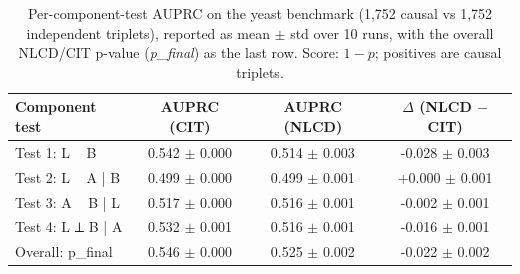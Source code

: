 \begin{table}
\centering
\caption{Per-component-test AUPRC on the yeast benchmark (1{,}752 causal vs 1{,}752 independent triplets), reported as mean $\pm$ std over 10 runs, with the overall NLCD/CIT p-value (\textit{p\_final}) as the last row. Score: $1-p$; positives are causal triplets.}
\label{tab:R2C5_per_test_auprc}
\begin{tabular}{lccc}
\toprule
    Component test &       AUPRC (CIT) &      AUPRC (NLCD) & $\Delta$ (NLCD $-$ CIT) \\
\midrule
    Test 1:  L ~ B & 0.542 $\pm$ 0.000 & 0.514 $\pm$ 0.003 &      -0.028 $\pm$ 0.003 \\
Test 2:  L ~ A | B & 0.499 $\pm$ 0.000 & 0.499 $\pm$ 0.001 &      +0.000 $\pm$ 0.001 \\
Test 3:  A ~ B | L & 0.517 $\pm$ 0.000 & 0.516 $\pm$ 0.001 &      -0.002 $\pm$ 0.001 \\
Test 4:  L ⟂ B | A & 0.532 $\pm$ 0.001 & 0.516 $\pm$ 0.001 &      -0.016 $\pm$ 0.001 \\
  Overall: p_final & 0.546 $\pm$ 0.000 & 0.525 $\pm$ 0.002 &      -0.022 $\pm$ 0.002 \\
\bottomrule
\end{tabular}
\end{table}
